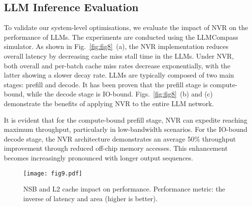 
\subsection{LLM Inference Evaluation}
\vspace{-3pt}

To validate our system-level optimisations, we evaluate the impact of NVR on the performance of LLMs. The experiments are conducted using the LLMCompass simulator.
As shown in Fig.~\ref{fig:fig8}~(a), the NVR implementation reduces overall latency by decreasing cache miss stall time in the LLMs.
Under NVR, both overall and per-batch cache miss rates decrease exponentially, with the latter showing a slower decay rate.
LLMs are typically composed of two main stages: prefill and decode. It has been proven that the prefill stage is compute-bound, while the decode stage is IO-bound.
Figs.~\ref{fig:fig8}~(b) and (c) demonstrate the benefits of applying NVR to the entire LLM network. 

It is evident that for the compute-bound prefill stage, NVR can expedite reaching maximum throughput, particularly in low-bandwidth scenarios.
For the IO-bound decode stage, the NVR architecture demonstrates an average 50\% throughput improvement through reduced off-chip memory accesses. This enhancement becomes increasingly pronounced with longer output sequences.







\begin{figure}[t]
\vspace{-2pt}
\texttt{[image: fig9.pdf]}
\vspace{-5pt}
\caption{NSB and L2 cache impact on performance. Performance metric: the inverse of latency and area (higher is better).}
\vspace{-12pt}
\label{fig:fig9}
\end{figure}

\vspace{-3pt}
